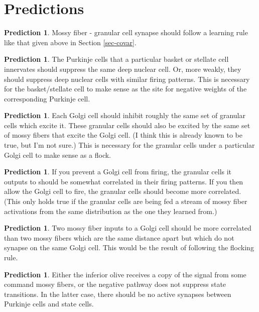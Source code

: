 \documentclass{article}
\theoremstyle{definition}
\newtheorem{pred}[thm]{Prediction}
\begin{document}
\section{Predictions}

\begin{pred}
Mossy fiber - granular cell synapse should follow a learning rule like
that given above in Section \ref{sec-covar}.
\end{pred}

\begin{pred}
The Purkinje cells that a particular basket or stellate cell
innervates should suppress the same deep nuclear cell. Or, more
weakly, they should suppress deep nuclear cells with similar firing
patterns. This is necessary for the basket/stellate cell to make sense
as the site for negative weights of the corresponding Purkinje cell.
\end{pred}

\begin{pred}
Each Golgi cell should inhibit roughly the same set of granular cells
which excite it. These granular cells should also be excited by the
same set of mossy fibers that excite the Golgi cell. (I think this is
already known to be true, but I'm not sure.) This is necessary for the
granular cells under a particular Golgi cell to make sense as a flock.
\end{pred}

\begin{pred}
If you prevent a Golgi cell from firing, the granular cells it outputs
to should be somewhat correlated in their firing patterns. If you then
allow the Golgi cell to fire, the granular cells should become more
correlated. (This only holds true if the granular cells are being fed
a stream of mossy fiber activations from the same distribution as the
one they learned from.)
\end{pred}

\begin{pred}
Two mossy fiber inputs to a Golgi cell should be more correlated than
two mossy fibers which are the same distance apart but which do not
synapse on the same Golgi cell. This would be the result of following
the flocking rule.
\end{pred}

\begin{pred}
Either the inferior olive receives a copy of the signal from some
command mossy fibers, or the negative pathway does not suppress state
transitions. In the latter case, there should be no active synapses
between Purkinje cells and state cells.
\end{pred}
\end{document}
